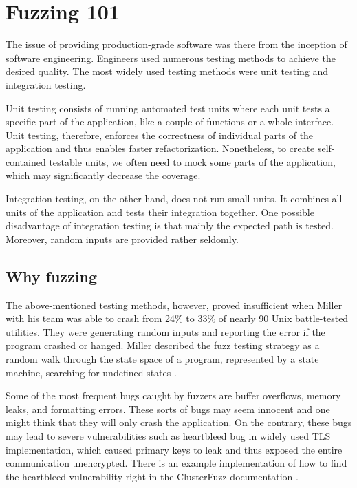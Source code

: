 \chapter{Fuzzing 101}
\label{cha:Introduction to fuzzing}
The issue of providing production-grade software was there from the inception of software engineering. Engineers used numerous testing methods to achieve the desired quality. The most widely used testing methods were unit testing and integration testing.

Unit testing consists of running automated test units where each unit tests a specific part of the application, like a couple of functions or a whole interface. Unit testing, therefore, enforces the correctness of individual parts of the application and thus enables faster refactorization. Nonetheless, to create self-contained testable units, we often need to mock some parts of the application, which may significantly decrease the coverage.

Integration testing, on the other hand, does not run small units. It combines all units of the application and tests their integration together. One possible disadvantage of integration testing is that mainly the expected path is tested. Moreover, random inputs are provided rather seldomly.


\section{Why fuzzing}
The above-mentioned testing methods, however, proved insufficient when Miller with his team was able to crash from 24\% to 33\% of nearly 90 Unix battle-tested utilities. They were generating random inputs and reporting the error if the program crashed or hanged. Miller described the fuzz testing strategy as a random walk through the state space of a program, represented by a state machine, searching for undefined states \cite{miller1990empirical}.

Some of the most frequent bugs caught by fuzzers are buffer overflows, memory leaks, and formatting errors. These sorts of bugs may seem innocent and one might think that they will only crash the application. On the contrary, these bugs may lead to severe vulnerabilities such as heartbleed bug \cite{heartbleed2020bug} in widely used TLS implementation, which caused primary keys to leak and thus exposed the entire communication unencrypted. There is an example implementation of how to find the heartbleed vulnerability right in the ClusterFuzz documentation \cite{clusterfuzz2020heartbleed}.



